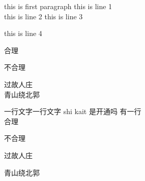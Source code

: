 \documentclass[12pt]{article}
\begin{document}
\tableofcontents




this is first paragraph
this is line 1\\
this is line 2
this is line 3

this is line 4


合理

不合理

过故人庄\\

青山绕北郭

一行文字一行文字
shi kait 是开通吗
\bigskip
有一行\\

合理

不合理

      过故人庄

青山绕北郭
\end{document}
